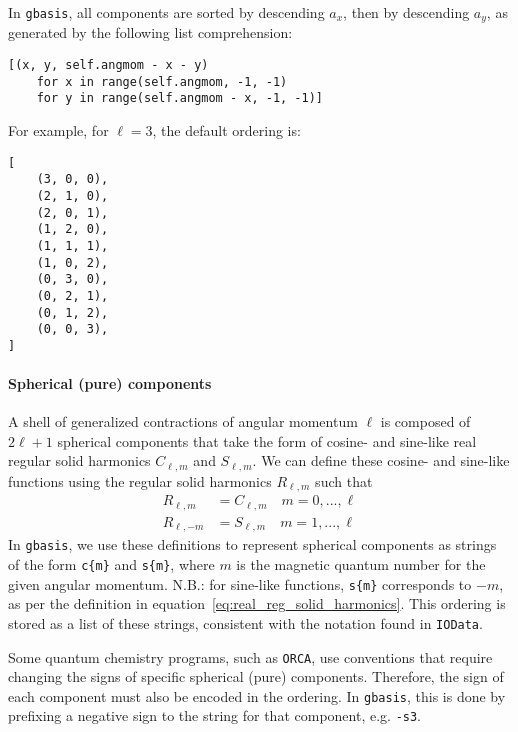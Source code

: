 \documentclass[letterpaper]{article}
\begin{document}
In \verb|gbasis|, all components are sorted by descending $a_x$, then by descending $a_y$,
as generated by the following list comprehension:
\begin{lstlisting}
[(x, y, self.angmom - x - y)
    for x in range(self.angmom, -1, -1)
    for y in range(self.angmom - x, -1, -1)]
\end{lstlisting}
For example, for $\ell = 3$, the default ordering is:
\begin{lstlisting}
[
    (3, 0, 0),
    (2, 1, 0),
    (2, 0, 1),
    (1, 2, 0),
    (1, 1, 1),
    (1, 0, 2),
    (0, 3, 0),
    (0, 2, 1),
    (0, 1, 2),
    (0, 0, 3),
]
\end{lstlisting}

\paragraph{Spherical (pure) components}
A shell of generalized contractions of angular momentum $\ell$ is composed of $2 \ell + 1$ spherical
components that take the form of cosine- and sine-like real regular solid harmonics $C_{\ell, m}$ and
$S_{\ell, m}$.
We can define these cosine- and sine-like functions using the regular solid harmonics
$R_{\ell, m}$ such that
\begin{equation}
  \label{eq:real_reg_solid_harmonics}
  \begin{split}
    R_{\ell, m} &= C_{\ell, m} \quad m = 0, ..., \ell \\
    R_{\ell, -m} &= S_{\ell, m} \quad m = 1, ..., \ell
  \end{split}
\end{equation}
In \verb|gbasis|, we use these definitions to represent spherical components as strings of the form
\verb|c{m}| and \verb|s{m}|,
where $m$ is the magnetic quantum number for the given angular momentum.
N.B.: for sine-like functions, \verb|s{m}| corresponds to $-m$, as per the definition in
equation~\ref{eq:real_reg_solid_harmonics}.
This ordering is stored as a list of these strings,
consistent with the notation found in \verb|IOData|.

Some quantum chemistry programs, such as \verb|ORCA|, use conventions that require changing
the signs of specific spherical (pure) components.
Therefore, the sign of each component must also be encoded in the ordering.
In \verb|gbasis|, this is done by prefixing a negative sign to the string for that component,
e.g. \verb|-s3|.
\end{document}
